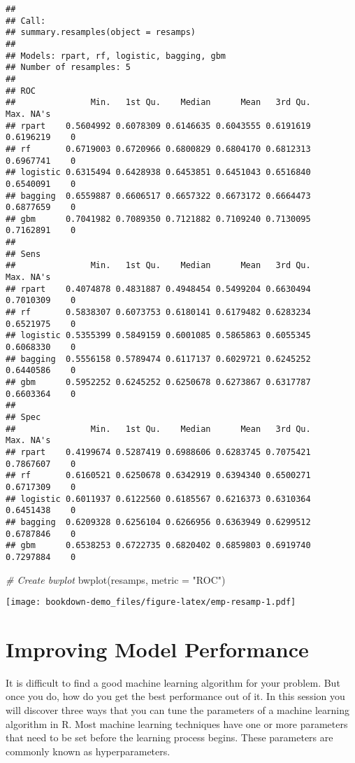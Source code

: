 \documentclass[
]{book}
\newenvironment{Shaded}{\begin{snugshade}}{\end{snugshade}}
\newcommand{\AttributeTok}[1]{\textcolor[rgb]{0.77,0.63,0.00}{#1}}
\newcommand{\CommentTok}[1]{\textcolor[rgb]{0.56,0.35,0.01}{\textit{#1}}}
\newcommand{\FunctionTok}[1]{\textcolor[rgb]{0.00,0.00,0.00}{#1}}
\newcommand{\NormalTok}[1]{#1}
\newcommand{\StringTok}[1]{\textcolor[rgb]{0.31,0.60,0.02}{#1}}
\begin{document}
\begin{verbatim}
## 
## Call:
## summary.resamples(object = resamps)
## 
## Models: rpart, rf, logistic, bagging, gbm 
## Number of resamples: 5 
## 
## ROC 
##               Min.   1st Qu.    Median      Mean   3rd Qu.      Max. NA's
## rpart    0.5604992 0.6078309 0.6146635 0.6043555 0.6191619 0.6196219    0
## rf       0.6719003 0.6720966 0.6800829 0.6804170 0.6812313 0.6967741    0
## logistic 0.6315494 0.6428938 0.6453851 0.6451043 0.6516840 0.6540091    0
## bagging  0.6559887 0.6606517 0.6657322 0.6673172 0.6664473 0.6877659    0
## gbm      0.7041982 0.7089350 0.7121882 0.7109240 0.7130095 0.7162891    0
## 
## Sens 
##               Min.   1st Qu.    Median      Mean   3rd Qu.      Max. NA's
## rpart    0.4074878 0.4831887 0.4948454 0.5499204 0.6630494 0.7010309    0
## rf       0.5838307 0.6073753 0.6180141 0.6179482 0.6283234 0.6521975    0
## logistic 0.5355399 0.5849159 0.6001085 0.5865863 0.6055345 0.6068330    0
## bagging  0.5556158 0.5789474 0.6117137 0.6029721 0.6245252 0.6440586    0
## gbm      0.5952252 0.6245252 0.6250678 0.6273867 0.6317787 0.6603364    0
## 
## Spec 
##               Min.   1st Qu.    Median      Mean   3rd Qu.      Max. NA's
## rpart    0.4199674 0.5287419 0.6988606 0.6283745 0.7075421 0.7867607    0
## rf       0.6160521 0.6250678 0.6342919 0.6394340 0.6500271 0.6717309    0
## logistic 0.6011937 0.6122560 0.6185567 0.6216373 0.6310364 0.6451438    0
## bagging  0.6209328 0.6256104 0.6266956 0.6363949 0.6299512 0.6787846    0
## gbm      0.6538253 0.6722735 0.6820402 0.6859803 0.6919740 0.7297884    0
\end{verbatim}

\begin{Shaded}
\begin{Highlighting}[]
\CommentTok{\# Create bwplot}
\FunctionTok{bwplot}\NormalTok{(resamps, }\AttributeTok{metric =} \StringTok{"ROC"}\NormalTok{)}
\end{Highlighting}
\end{Shaded}

\texttt{[image: bookdown-demo\_files/figure-latex/emp-resamp-1.pdf]}

\hypertarget{improving-model-performance}{%
\section{Improving Model Performance}\label{improving-model-performance}}

It is difficult to find a good machine learning algorithm for your problem. But once you do, how do you get the best performance out of it. In this session you will discover three ways that you can tune the parameters of a machine learning algorithm in R. Most machine learning techniques have one or more parameters that need to be set before the learning process begins. These parameters are commonly known as hyperparameters.
\end{document}
